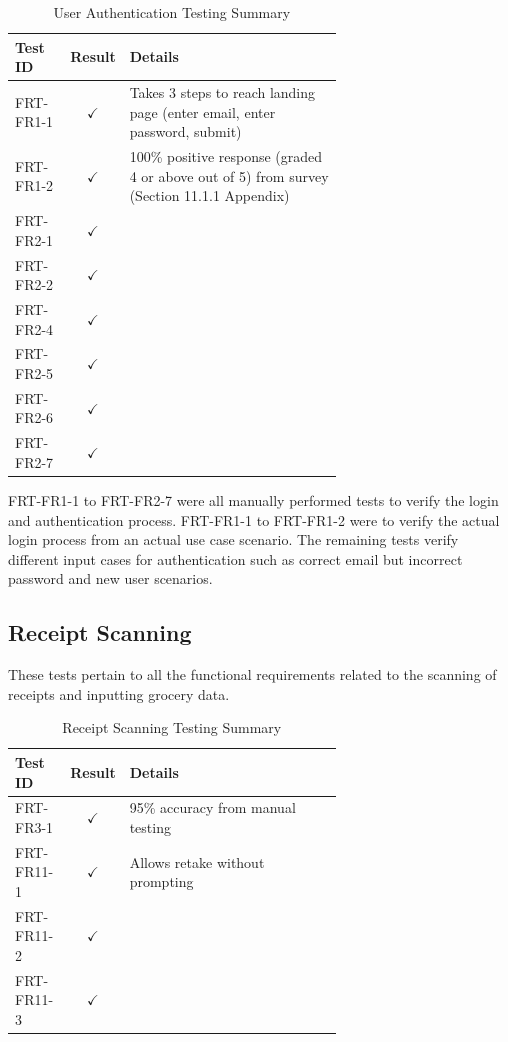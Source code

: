 \documentclass[12pt, titlepage]{article}
\begin{document}
\begin{longtable}{|l|c|p{0.65\linewidth}|}
  \caption{User Authentication Testing Summary} \label{User Authentication Testing Summary} \\
  \toprule
  \textbf{Test ID} & \textbf{Result} & \textbf{Details} \\
  \midrule
  FRT-FR1-1 & $\checkmark$ & Takes 3 steps to reach landing page (enter email, enter password, submit) \\
  \midrule
  FRT-FR1-2 & $\checkmark$ & 100\% positive response (graded 4 or above out of 5) from survey (Section 11.1.1 Appendix) \\
  \midrule
  FRT-FR2-1 & $\checkmark$ & \\
  \midrule
  FRT-FR2-2 & $\checkmark$ & \\
  \midrule
  FRT-FR2-4 & $\checkmark$ & \\
  \midrule
  FRT-FR2-5 & $\checkmark$ & \\
  \midrule
  FRT-FR2-6 & $\checkmark$ & \\
  \midrule
  FRT-FR2-7 & $\checkmark$ & \\
  \bottomrule
\end{longtable}

FRT-FR1-1 to FRT-FR2-7 were all manually performed tests to verify the login and authentication process.
FRT-FR1-1 to FRT-FR1-2 were to verify the actual login process from an actual use case scenario. The remaining
tests verify different input cases for authentication such as correct email but incorrect password and
new user scenarios.

\subsection{Receipt Scanning}

These tests pertain to all the functional requirements related to the scanning
of receipts and inputting grocery data.

\begin{longtable}{|l|c|p{0.65\linewidth}|}
  \caption{Receipt Scanning Testing Summary} \label{Receipt Scanning Testing Summary} \\
  \toprule
  \textbf{Test ID} & \textbf{Result} & \textbf{Details} \\
  \midrule
  FRT-FR3-1 & $\checkmark$ & 95\% accuracy from manual testing\\
  \midrule
  FRT-FR11-1 & $\checkmark$ & Allows retake without prompting \\
  \midrule
  FRT-FR11-2 & $\checkmark$ & \\
  \midrule
  FRT-FR11-3 & $\checkmark$ & \\
  \bottomrule
\end{longtable}
\end{document}
